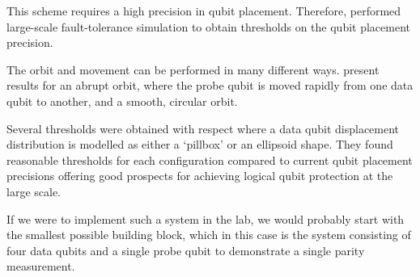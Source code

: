 This scheme requires a high precision in qubit placement. Therefore, \citet{OGorman2016} performed large-scale fault-tolerance simulation to obtain thresholds on the qubit placement precision.

The orbit and movement can be performed in many different ways. \citet{OGorman2016} present results for an abrupt orbit, where the probe qubit is moved rapidly from one data qubit to another, and a smooth, circular orbit.

Several thresholds were obtained with respect where a data qubit displacement distribution is modelled as either a `pillbox' or an ellipsoid shape.
They found reasonable thresholds for each configuration compared to current qubit placement precisions offering good prospects for achieving logical qubit protection at the large scale. 

If we were to implement such a system in the lab, we would probably start with the smallest possible building block, which in this case is the system consisting of four data qubits and a single probe qubit to demonstrate a single parity measurement.

